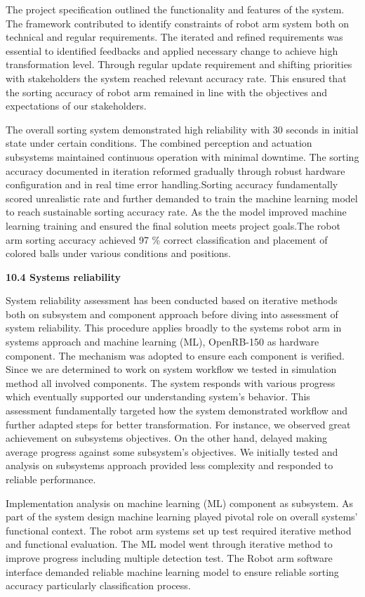 The project specification outlined the functionality  and features of the system. The framework contributed to identify constraints of robot arm system both on technical and regular requirements. The iterated and refined requirements was essential to identified  feedbacks and applied necessary change to achieve high transformation level. Through regular update requirement and shifting priorities with stakeholders the system reached relevant accuracy rate. This ensured that the sorting accuracy of robot arm remained in line with the objectives and expectations of our stakeholders. 


The overall sorting system demonstrated high reliability with 30 seconds in initial state under certain conditions. The combined perception and actuation subsystems maintained  continuous operation with minimal downtime. The sorting accuracy documented in iteration  reformed gradually through robust hardware configuration and in real time error handling.Sorting accuracy fundamentally scored unrealistic rate and further demanded to train the machine learning model to reach sustainable sorting accuracy rate. As the the model improved machine learning training and ensured the final solution meets project goals.The robot arm sorting accuracy achieved 97 \% correct classification and placement of colored balls under various conditions and positions.


\textbf{10.4 Systems reliability }

System reliability assessment  has been conducted based on iterative methods both on subsystem and component approach before diving into assessment of system reliability. This procedure applies broadly to the systems robot arm in systems approach and machine learning (ML), OpenRB-150 as hardware component. The mechanism was adopted to ensure each component is verified. Since we are determined to work on system workflow we tested in simulation method all involved components. The system responds with various progress which eventually  supported our understanding system's behavior. This assessment fundamentally targeted how the system demonstrated workflow and further adapted steps for better transformation. For instance, we observed great achievement on subsystems objectives. On the other hand, delayed making average progress against some subsystem’s objectives. We initially tested and analysis on subsystems approach provided less complexity and responded to reliable performance. 




Implementation analysis on machine learning (ML) component as subsystem. As part of the system design machine learning played pivotal role on overall systems’ functional context. The robot arm systems set up  test required iterative method and functional evaluation. The ML model went through iterative method to improve progress including multiple detection test. The Robot arm software interface demanded reliable machine learning model to ensure reliable sorting accuracy particularly classification process. 



